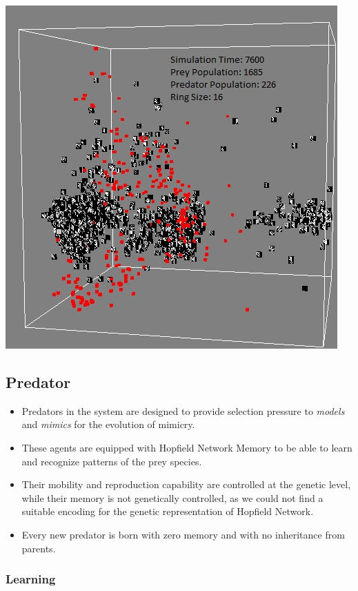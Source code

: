 \documentclass[a0,portrait]{a0poster}
\begin{document}
\begin{multicols}{2}
\begin{center}\vspace{1cm}
\includegraphics[width=0.5\linewidth]{simTime7600.png}
\end{center}\vspace{1cm}

\color{SaddleBrown} 
\subsection*{Predator}

\begin{itemize}
	\item Predators in the system are designed to provide selection pressure to \textit{models} and \textit{mimics} for the evolution of mimicry. 
	\item These agents are equipped with Hopfield Network Memory to be able to learn and recognize patterns of the prey species.
	\item Their mobility and reproduction capability are controlled at the genetic level, while their memory is not genetically controlled, as we could not find a suitable encoding for the genetic representation of Hopfield Network.
	\item Every new predator is born with zero memory and with no inheritance from parents.
\end{itemize}

\color{DarkSlateGray}
\subsubsection*{Learning}


\end{multicols}
\end{document}
